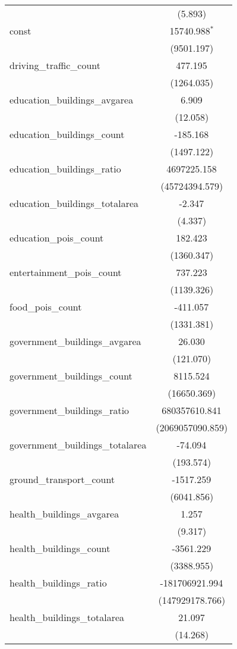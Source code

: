 \begin{table}[!htbp]
\begin{tabular}{@{\extracolsep{5pt}}lc}
  & (5.893) \\
 const & 15740.988$^{*}$ \\
  & (9501.197) \\
 driving_traffic_count & 477.195$^{}$ \\
  & (1264.035) \\
 education_buildings_avgarea & 6.909$^{}$ \\
  & (12.058) \\
 education_buildings_count & -185.168$^{}$ \\
  & (1497.122) \\
 education_buildings_ratio & 4697225.158$^{}$ \\
  & (45724394.579) \\
 education_buildings_totalarea & -2.347$^{}$ \\
  & (4.337) \\
 education_pois_count & 182.423$^{}$ \\
  & (1360.347) \\
 entertainment_pois_count & 737.223$^{}$ \\
  & (1139.326) \\
 food_pois_count & -411.057$^{}$ \\
  & (1331.381) \\
 government_buildings_avgarea & 26.030$^{}$ \\
  & (121.070) \\
 government_buildings_count & 8115.524$^{}$ \\
  & (16650.369) \\
 government_buildings_ratio & 680357610.841$^{}$ \\
  & (2069057090.859) \\
 government_buildings_totalarea & -74.094$^{}$ \\
  & (193.574) \\
 ground_transport_count & -1517.259$^{}$ \\
  & (6041.856) \\
 health_buildings_avgarea & 1.257$^{}$ \\
  & (9.317) \\
 health_buildings_count & -3561.229$^{}$ \\
  & (3388.955) \\
 health_buildings_ratio & -181706921.994$^{}$ \\
  & (147929178.766) \\
 health_buildings_totalarea & 21.097$^{}$ \\
  & (14.268) \\

\end{tabular}
\end{table}
